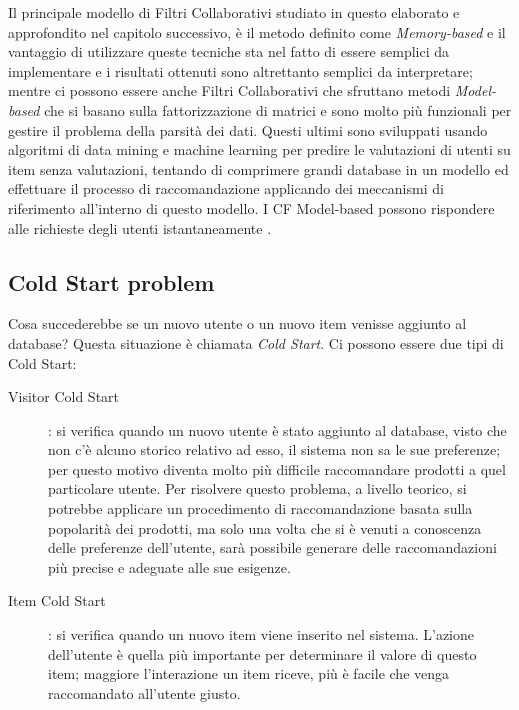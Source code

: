 Il principale modello di Filtri Collaborativi studiato in questo elaborato e approfondito nel capitolo successivo, è il metodo definito 
come \textit{Memory-based} e il  vantaggio di utilizzare queste tecniche sta nel fatto di essere semplici da implementare e i risultati 
ottenuti sono altrettanto semplici da interpretare; mentre ci possono essere anche Filtri Collaborativi che sfruttano metodi 
\textit{Model-based} che si basano sulla fattorizzazione di matrici e sono molto più funzionali per gestire il problema della 
parsità dei dati. Questi ultimi sono sviluppati usando algoritmi di data mining e machine learning per predire le valutazioni di utenti 
su item senza valutazioni, tentando di comprimere grandi database in un modello ed effettuare il processo di raccomandazione applicando dei
meccanismi di riferimento all'interno di questo modello. 
I CF Model-based possono rispondere alle richieste degli utenti istantaneamente \cite{model-based-approach-for-collaborative-filtering}.


\subsection{Cold Start problem} 
Cosa succederebbe se un nuovo utente o un nuovo item venisse aggiunto al database? Questa situazione è chiamata \textit{Cold Start}. Ci possono
essere due tipi di Cold Start:
\begin{description}
	\item[Visitor Cold Start]: si verifica quando un nuovo utente è stato aggiunto al database, visto che non c'è alcuno storico relativo ad esso, il sistema non
	sa le sue preferenze; per questo motivo diventa molto più difficile raccomandare prodotti a quel particolare utente. Per risolvere questo problema,
	a livello teorico, si potrebbe applicare un procedimento di raccomandazione basata sulla popolarità dei prodotti, ma solo una volta che si è venuti a 
	conoscenza delle preferenze dell'utente, sarà possibile generare delle raccomandazioni più precise e adeguate alle sue esigenze.
	\item[Item Cold Start]: si verifica quando un nuovo item viene inserito nel sistema. L'azione dell'utente è quella più importante per determinare
	il valore di questo item; maggiore l'interazione un item riceve, più è facile che venga raccomandato all'utente giusto.  
\end{description}



